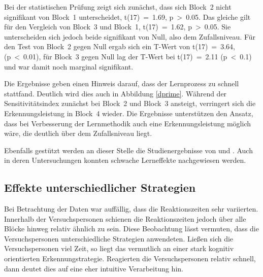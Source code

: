 \documentclass[doc,a4paper,12pt]{apa6}
\begin{document}
Bei der statistischen Prüfung zeigt sich zunächst, dass sich Block~2 nicht signifikant von Block~1 unterscheidet, t(17)~=~1.69, p~>~0.05. Das gleiche gilt für den Vergleich von Block~3 und Block~1, t(17)~=~1.62, p~>~0.05. Sie unterscheiden sich jedoch beide signifikant von Null, also dem Zufallsniveau. Für den Test von Block~2 gegen Null ergab sich ein T-Wert von t(17)~=~3.64, (p~<~0.01), für Block~3 gegen Null lag der T-Wert bei t(17)~=~2.11 (p~<~0.1) und war damit noch marginal signifikant.

Die Ergebnisse geben einen Hinweis darauf, dass der Lernprozess zu schnell stattfand. Deutlich wird dies auch in Abbildung \ref{dprime}. Während der Sensitivitätsindex zunächst bei Block~2 und Block~3 ansteigt, verringert sich die Erkennungsleistung in Block~4 wieder. Die Ergebnisse unterstützen den Ansatz, dass bei Verbesserung der Lernmethodik auch eine Erkennungsleistung möglich wäre, die deutlich über dem Zufallsniveau liegt.

Ebenfalls gestützt werden an dieser Stelle die Studienergebnisse von \textcite{paavilainen2007preattentive} und \textcite{bendixen2008rapid}. Auch in deren Untersuchungen konnten schwache Lerneffekte nachgewiesen werden.

\subsection{Effekte unterschiedlicher Strategien}

Bei Betrachtung der Daten war auffällig, dass die Reaktionszeiten sehr variierten. Innerhalb der Versuchspersonen schienen die Reaktionszeiten jedoch über alle Blöcke hinweg relativ ähnlich zu sein. Diese Beobachtung lässt vermuten, dass die Versuchspersonen unterschiedliche Strategien anwendeten. Ließen sich die Versuchspersonen viel Zeit, so liegt das vermutlich an einer stark kognitiv orientierten Erkennungstrategie. Reagierten die Versuchspersonen relativ schnell, dann deutet dies auf eine eher intuitive Verarbeitung hin.
\end{document}
